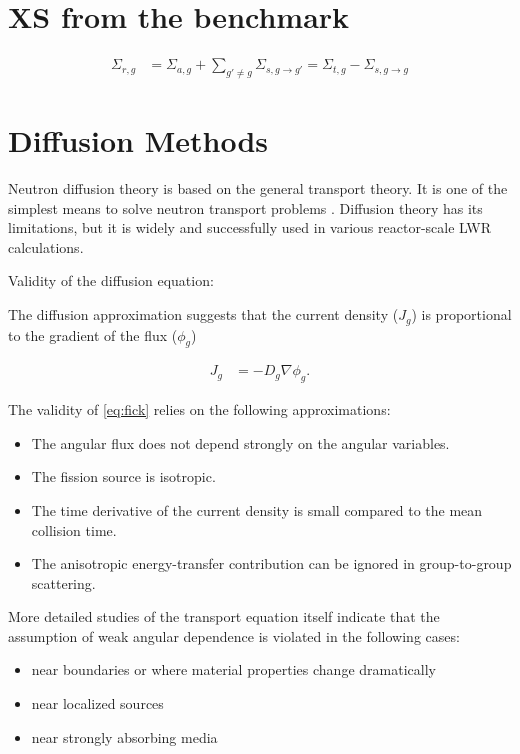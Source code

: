 \documentclass[11pt,letterpaper]{article}
\begin{document}
\section{XS from the benchmark}

\begin{align}
\Sigma_{r,g} &= \Sigma_{a,g} + \sum_{g' \ne g} \Sigma_{s,g \rightarrow g'} = \Sigma_{t,g} - \Sigma_{s, g \rightarrow g}
\label{eq:removal}
\end{align}

\section{Diffusion Methods}

Neutron diffusion theory is based on the general transport theory.
It is one of the simplest means to solve neutron transport problems \cite{leppanen_development_2007}.
Diffusion theory has its limitations, but it is widely and successfully used in various reactor-scale LWR calculations.

Validity of the diffusion equation:

The diffusion approximation suggests that the current density ($J_g$) is proportional to the gradient of the flux ($\phi_g$)

\begin{align}
J_g &= -D_g \nabla \phi_g.
\label{eq:fick}
\end{align}

The validity of \ref{eq:fick} relies on the following approximations:


\begin{itemize}
	\item The angular flux does not depend strongly on the angular variables.
	\item The fission source is isotropic.
	\item The time derivative of the current density is small compared to the mean collision time.
	\item The anisotropic energy-transfer contribution can be ignored in group-to-group scattering.
\end{itemize}

More detailed studies of the transport equation itself indicate that the assumption of weak angular dependence is violated in the following cases:
\begin{itemize}
    \item near boundaries or where material properties change dramatically
    \item near localized sources
    \item near strongly absorbing media
\end{itemize}
\end{document}
